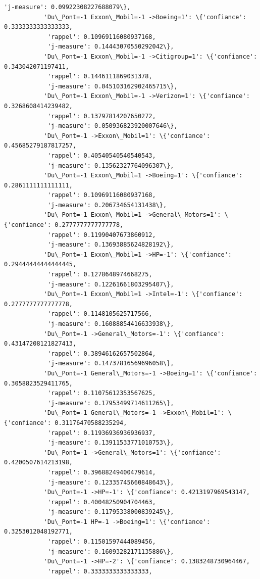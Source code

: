 \documentclass[11pt]{article}
\begin{document}
\begin{Verbatim}[commandchars=\\\{\}]
            'j-measure': 0.09922308227688079\},
           'Du\_Pont=-1 Exxon\_Mobil=-1 ->Boeing=1': \{'confiance': 0.3333333333333333,
            'rappel': 0.10969116080937168,
            'j-measure': 0.14443070550292042\},
           'Du\_Pont=-1 Exxon\_Mobil=-1 ->Citigroup=1': \{'confiance': 0.343042071197411,
            'rappel': 0.1446111869031378,
            'j-measure': 0.045103162902465715\},
           'Du\_Pont=-1 Exxon\_Mobil=-1 ->Verizon=1': \{'confiance': 0.3268608414239482,
            'rappel': 0.13797814207650272,
            'j-measure': 0.050936823920007646\},
           'Du\_Pont=-1 ->Exxon\_Mobil=1': \{'confiance': 0.45685279187817257,
            'rappel': 0.40540540540540543,
            'j-measure': 0.13562327764096307\},
           'Du\_Pont=-1 Exxon\_Mobil=1 ->Boeing=1': \{'confiance': 0.2861111111111111,
            'rappel': 0.10969116080937168,
            'j-measure': 0.206734654131438\},
           'Du\_Pont=-1 Exxon\_Mobil=1 ->General\_Motors=1': \{'confiance': 0.2777777777777778,
            'rappel': 0.11990407673860912,
            'j-measure': 0.13693885624828192\},
           'Du\_Pont=-1 Exxon\_Mobil=1 ->HP=-1': \{'confiance': 0.29444444444444445,
            'rappel': 0.1278648974668275,
            'j-measure': 0.12261661803295407\},
           'Du\_Pont=-1 Exxon\_Mobil=1 ->Intel=-1': \{'confiance': 0.2777777777777778,
            'rappel': 0.1148105625717566,
            'j-measure': 0.16088854416633938\},
           'Du\_Pont=-1 ->General\_Motors=-1': \{'confiance': 0.43147208121827413,
            'rappel': 0.38946162657502864,
            'j-measure': 0.14737816569696058\},
           'Du\_Pont=-1 General\_Motors=-1 ->Boeing=1': \{'confiance': 0.3058823529411765,
            'rappel': 0.11075612353567625,
            'j-measure': 0.17953499714611265\},
           'Du\_Pont=-1 General\_Motors=-1 ->Exxon\_Mobil=1': \{'confiance': 0.31176470588235294,
            'rappel': 0.11936936936936937,
            'j-measure': 0.13911533771010753\},
           'Du\_Pont=-1 ->General\_Motors=1': \{'confiance': 0.4200507614213198,
            'rappel': 0.39688249400479614,
            'j-measure': 0.12335745660848643\},
           'Du\_Pont=-1 ->HP=-1': \{'confiance': 0.4213197969543147,
            'rappel': 0.40048250904704463,
            'j-measure': 0.11795338000839245\},
           'Du\_Pont=-1 HP=-1 ->Boeing=1': \{'confiance': 0.3253012048192771,
            'rappel': 0.11501597444089456,
            'j-measure': 0.16093282171135886\},
           'Du\_Pont=-1 ->HP=-2': \{'confiance': 0.1383248730964467,
            'rappel': 0.3333333333333333,

\end{Verbatim}
\end{document}
